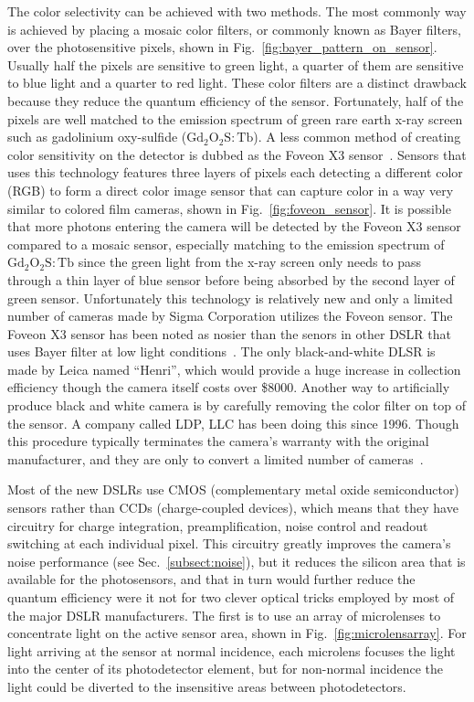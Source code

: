 The color selectivity can be achieved with two methods.  The most commonly way is achieved by placing a mosaic color filters, or commonly known as Bayer filters, over the photosensitive pixels, shown in Fig.~\ref{fig:bayer_pattern_on_sensor}.  Usually half the pixels are sensitive to green light, a quarter of them are sensitive to blue light and a quarter to red light.  These color filters are a distinct drawback because they reduce the quantum efficiency of the sensor.  Fortunately, half of the pixels are well matched to the emission spectrum of green rare earth x-ray screen such as gadolinium oxy-sulfide ($\mathrm{Gd_2O_2S:Tb}$).  A less common method of creating color sensitivity on the detector is dubbed as the Foveon X3 sensor~\citep{foveon}.  Sensors that uses this technology features three layers of pixels each detecting a different color (RGB) to form a direct color image sensor that can capture color in a way very similar to colored film cameras, shown in Fig.~\ref{fig:foveon_sensor}.  It is possible that more photons entering the camera will be detected by the Foveon X3 sensor compared to a mosaic sensor, especially matching to the emission spectrum of $\mathrm{Gd_2O_2S:Tb}$ since the green light from the x-ray screen only needs to pass through a thin layer of blue sensor before being absorbed by the second layer of green sensor.  Unfortunately this technology is relatively new and only a limited number of cameras made by Sigma Corporation utilizes the Foveon sensor.  The Foveon X3 sensor has been noted as nosier than the senors in other DSLR that uses Bayer filter at low light conditions~\citep{sigmasd10, stevesdigicams}.  The only black-and-white DLSR is made by Leica named ``Henri'', which would provide a huge increase in collection efficiency though the camera itself costs over \$8000.  Another way to artificially produce black and white camera is by carefully removing the color filter on top of the sensor.  A company called LDP, LLC has been doing this since 1996.  Though this procedure typically terminates the camera's warranty with the original manufacturer, and they are only to convert a limited number of cameras~\citep{maxmax}.

Most of the new DSLRs use CMOS (complementary metal oxide semiconductor) sensors rather than CCDs (charge-coupled devices), which means that they have circuitry for charge integration, preamplification, noise control and readout switching at each individual pixel. This circuitry greatly improves the camera's noise performance (see Sec.~\ref{subsect:noise}), but it reduces the silicon area that is available for the photosensors, and that in turn would further reduce the quantum efficiency were it not for two clever optical tricks employed by most of the major DSLR manufacturers. The first is to use an array of microlenses to concentrate light on the active sensor area, shown in Fig.~\ref{fig:microlensarray}. For light arriving at the sensor at normal incidence, each microlens focuses the light into the center of its photodetector element, but for non-normal incidence the light could be diverted to the insensitive areas between photodetectors.

